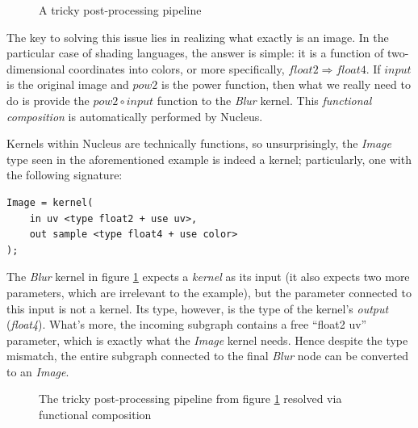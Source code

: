 \begin{figure}[h!]
  \centering
    \caption[A tricky post-processing pipeline]{A tricky post-processing pipeline}
  \label{fig:TrickyPostProc}
\end{figure}

The key to solving this issue lies in realizing what exactly is an image. In the particular case of shading languages, the answer is simple: it is a function of two-dimensional coordinates into colors, or more specifically, $float2 \Rightarrow float4$. If $input$ is the original image and $pow2$ is the power function, then what we really need to do is provide the $pow2 \circ input$ function to the \emph{Blur} kernel. This \emph{functional composition} is automatically performed by Nucleus.

Kernels within Nucleus are technically functions, so unsurprisingly, the \emph{Image} type seen in the aforementioned example is indeed a kernel; particularly, one with the following signature:
	
\begin{lstlisting}[frame=single]
Image = kernel(
    in uv <type float2 + use uv>,
    out sample <type float4 + use color>
);
\end{lstlisting}

The \emph{Blur} kernel in figure \ref{fig:TrickyPostProc} expects a \emph{kernel} as its input (it also expects two more parameters, which are irrelevant to the example), but the parameter connected to this input is not a kernel. Its type, however, is the type of the kernel's \emph{output} (\emph{float4}). What's more, the incoming subgraph contains a free ``float2 uv'' parameter, which is exactly what the \emph{Image} kernel needs. Hence despite the type mismatch, the entire subgraph connected to the final \emph{Blur} node can be converted to an \emph{Image}.

\begin{figure}[h!]
  \centering
    \caption[The tricky post-processing pipeline resolved]{The tricky post-processing pipeline from figure \ref{fig:TrickyPostProc} resolved via functional composition}
  \label{fig:TrickyPostProcResolve}
\end{figure}

